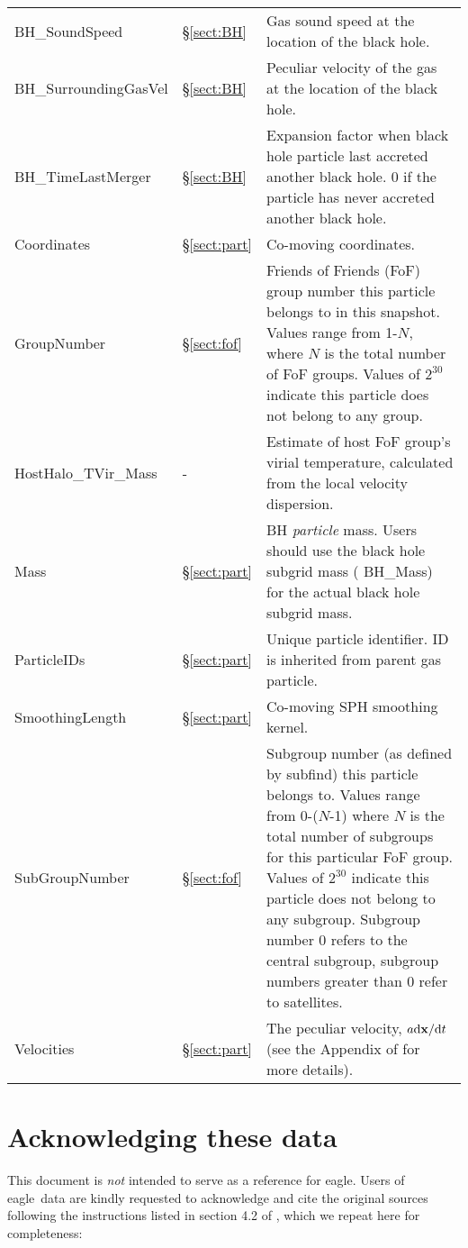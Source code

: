 \documentclass[10pt, a4paper]{article}
\newcommand{\groupnumber}{Friends of Friends (FoF) group number this particle
belongs to in this snapshot. Values range from 1-$N$, where $N$ is the total
number of FoF groups. Values of $2^{30}$ indicate this particle does not belong
to any group.}
\newcommand{\subgroupnumber}{Subgroup number (as defined by {\sc subfind}) this
particle belongs to. Values range from 0-($N$-1) where $N$ is the total number
of subgroups for this particular FoF group. Values of $2^{30}$ indicate this
particle does not belong to any subgroup. Subgroup number 0 refers to the
central subgroup, subgroup numbers greater than 0 refer to satellites.}
\newcommand{\velocity}{The peculiar velocity, $a{\rm d}{\bf x}/{\rm d}t$ (see
the Appendix of \cite{mcalpine2016} for more details).}
\newcommand{\coordinates}{Co-moving coordinates.}
\newcommand{\eagle}{{\sc eagle}}
\begin{document}
\begin{table}
\begin{center}
\begin{tabular}{>{\ttfamily}p{4cm}p{1.5cm}p{11cm}}
BH\_SoundSpeed &
\S\ref{sect:BH} &
Gas sound speed at the location of the black hole. \\

BH\_SurroundingGasVel &
\S\ref{sect:BH} &
Peculiar velocity of the gas at the location of the black hole. \\

BH\_TimeLastMerger  &
\S\ref{sect:BH} &
Expansion factor when black hole particle last accreted another black hole. 0 if the particle has never accreted another black hole. \\

Coordinates &
\S\ref{sect:part} &
\coordinates \\

GroupNumber &
\S\ref{sect:fof} &
\groupnumber \\

HostHalo\_TVir\_Mass &
- &
Estimate of host FoF group's virial temperature, calculated from the local velocity dispersion. \\

Mass &
\S\ref{sect:part} &
BH \textit{particle} mass. Users should use the black hole subgrid mass ({\sc
BH\_Mass}) for the actual black hole subgrid mass.\\

ParticleIDs &
\S\ref{sect:part} &
Unique particle identifier. ID is inherited from parent gas particle. \\

SmoothingLength &
\S\ref{sect:part} &
Co-moving SPH smoothing kernel. \\

SubGroupNumber &
\S\ref{sect:fof}
&
\subgroupnumber \\

Velocities &
\S\ref{sect:part} & \velocity \\

\hline
\end{tabular}
\end{center}
\end{table}

\section{Acknowledging these data}
This document is \emph{not} intended to serve as a reference for \eagle.  Users
of \eagle\ data are kindly requested to acknowledge and cite the original
sources following the instructions listed in section 4.2 of
\cite{mcalpine2016}, which we repeat here for completeness:
\end{document}
